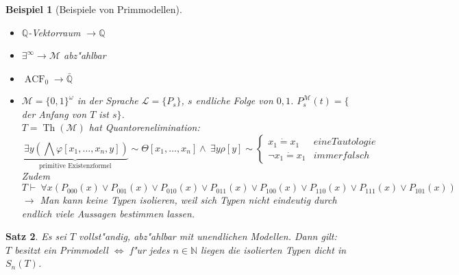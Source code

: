\documentclass[a4paper,12pt,numbers=noenddot,parskip=full]{scrartcl}
\newcommand{\setN}{\mathbb{N}}
\newcommand{\setQ}{\mathbb{Q}}
\newcommand{\Forall}{~\forall}
\newcommand{\Exists}{~\exists}
\newcommand{\scrL}{\mathcal{L}}
\newcommand{\scrM}{\mathcal{M}}
\DeclareMathOperator{\acf}{ACF}
\DeclareMathOperator{\Th}{Th}
\theoremstyle{dotless}
\newtheorem{theorem}{Satz}[section]
\newtheorem{example}[theorem]{Beispiel}
\begin{document}
\begin{example}[Beispiele von Primmodellen]
	\begin{itemize}
		\item $\setQ$-Vektorraum $\longrightarrow \setQ$
		\item $\exists^\infty \longrightarrow \scrM$ abz"ahlbar
		\item $\acf_0 \longrightarrow \bar{\setQ}$
		\item $\scrM = \{0,1\}^\omega$ in der Sprache $\scrL = \{P_s\}$, $s$ endliche Folge von $0, 1$. $P_s^\scrM(t) = \{$der Anfang von $T$ ist $s\}$.\\
		$T = \Th(\scrM)$ hat Quantorenelimination: \begin{equation*}
			\underbrace{\Exists y (\bigwedge \varphi[x_1, \dots, x_n, y])}_\text{primitive Existenzformel} \sim \Theta[x_1, \dots, x_n] \land \Exists y \rho[y] \sim \begin{cases*}
				x_1 \dot= x_1 &eine Tautologie\\
				\lnot x_1 \dot= x_1 &immer falsch
			\end{cases*}
		\end{equation*}
		Zudem \begin{equation*}
			T \vdash \Forall x (P_{000}(x) \lor P_{001}(x) \lor P_{010}(x) \lor P_{011}(x) \lor P_{100}(x) \lor P_{110}(x) \lor P_{111}(x) \lor P_{101}(x))
		\end{equation*}
		$\longrightarrow$ Man kann keine Typen isolieren, weil sich Typen nicht eindeutig durch endlich viele Aussagen bestimmen lassen.
	\end{itemize}
\end{example}
\begin{theorem}
	Es sei $T$ vollst"andig, abz"ahlbar mit unendlichen Modellen. Dann gilt: \\$T$ besitzt ein Primmodell $\Longleftrightarrow$ f"ur jedes $n \in \setN$ liegen die isolierten Typen dicht in $S_n(T)$.
\end{theorem}
\end{document}

